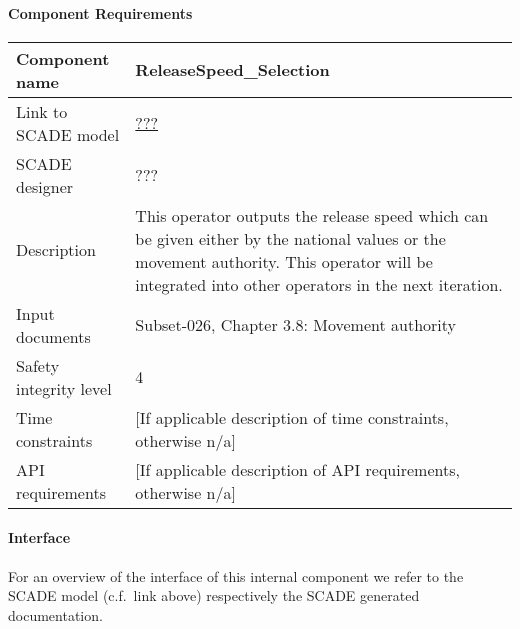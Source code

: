 
\paragraph{Component Requirements}

\begin{longtable}{p{}p{}}
\toprule
Component name			& ReleaseSpeed\_Selection \\
\midrule
Link to SCADE model		& {\footnotesize \url{???}} \\
\midrule
SCADE designer			& ??? \\
\midrule
Description				&This operator outputs the release speed which can be given either by the national values or the movement authority. This operator will be integrated into other operators in the next iteration.\\
\midrule
Input documents	& 
Subset-026, Chapter 3.8: Movement authority \\
\midrule
Safety integrity level		& 4 \\
\midrule
Time constraints		& [If applicable description of time constraints, otherwise n/a] \\
\midrule
API requirements 		& [If applicable description of API requirements, otherwise n/a] \\
\bottomrule
\end{longtable}


\paragraph{Interface}

For an overview of the interface of this internal component we refer to the SCADE model (c.f.~link above) respectively the SCADE generated documentation.